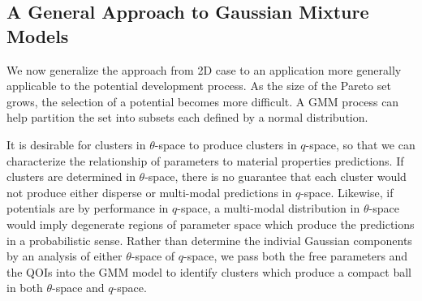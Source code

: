 \subsection{A General Approach to Gaussian Mixture Models}

We now generalize the approach from 2D case to an application more generally applicable to the potential development process.  As the size of the Pareto set grows, the selection of a potential becomes more difficult.  A GMM process can help partition the set into subsets each defined by a normal distribution.

It is desirable for clusters in $\theta$-space to produce clusters in $q$-space, so that we can characterize the relationship of parameters to material properties predictions.  If clusters are determined in $\theta$-space, there is no guarantee that each cluster would not produce either disperse or multi-modal predictions in $q$-space.  Likewise, if potentials are by performance in $q$-space, a multi-modal distribution in $\theta$-space would imply degenerate regions of parameter space which produce the predictions in a probabilistic sense.  Rather than determine the indivial Gaussian components by an analysis of either $\theta$-space of $q$-space, we pass both the free parameters and the QOIs into the GMM model to identify clusters which produce a compact ball in both $\theta$-space and $q$-space.

